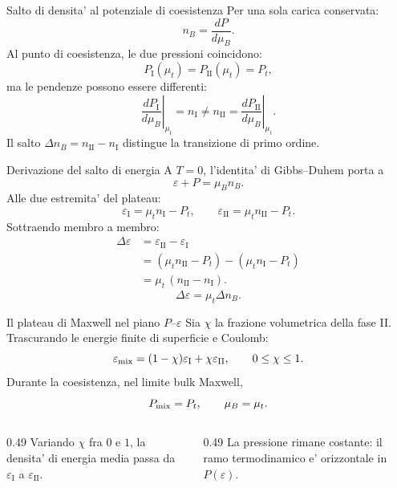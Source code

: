 \begin{frame}{Salto di densita' al potenziale di coesistenza}
\small
Per una sola carica conservata:
\[
n_B=\frac{dP}{d\mu_B}.
\]
Al punto di coesistenza, le due pressioni coincidono:
\[
P_{\mathrm I}(\mu_t)=P_{\mathrm{II}}(\mu_t)=P_t,
\]
ma le pendenze possono essere differenti:
\[
\left.\frac{dP_{\mathrm I}}{d\mu_B}\right|_{\mu_t}
=n_{\mathrm I}\ne n_{\mathrm{II}}
=\left.\frac{dP_{\mathrm{II}}}{d\mu_B}\right|_{\mu_t}.
\]
Il salto $\Delta n_B=n_{\mathrm{II}}-n_{\mathrm I}$ distingue
la transizione di primo ordine.
\end{frame}

\begin{frame}{Derivazione del salto di energia}
\small
A $T=0$, l'identita' di Gibbs--Duhem porta a
\[
\varepsilon+P=\mu_B n_B.
\]
Alle due estremita' del plateau:
\[
\varepsilon_{\mathrm I}=\mu_t n_{\mathrm I}-P_t,
\qquad
\varepsilon_{\mathrm{II}}=\mu_t n_{\mathrm{II}}-P_t.
\]
Sottraendo membro a membro:
\[
\begin{aligned}
\Delta\varepsilon
&=\varepsilon_{\mathrm{II}}-\varepsilon_{\mathrm I}\\
&=(\mu_t n_{\mathrm{II}}-P_t)
 -(\mu_t n_{\mathrm I}-P_t)\\
&=\mu_t\,(n_{\mathrm{II}}-n_{\mathrm I}).
\end{aligned}
\]
\[
\Delta\varepsilon=\mu_t\Delta n_B.
\]
\end{frame}

\begin{frame}{Il plateau di Maxwell nel piano $P$--$\varepsilon$}
\small
Sia $\chi$ la frazione volumetrica della fase II.
Trascurando le energie finite di superficie e Coulomb:
\[
\varepsilon_{\rm mix}=(1-\chi)\varepsilon_{\mathrm I}
+\chi\varepsilon_{\mathrm{II}},\qquad 0\le\chi\le1.
\]
Durante la coesistenza, nel limite bulk Maxwell,
\[
P_{\rm mix}=P_t,\qquad \mu_B=\mu_t.
\]
\begin{columns}[T,onlytextwidth]
\begin{column}{0.49\textwidth}
Variando $\chi$ fra $0$ e $1$, la densita' di energia media passa da $\varepsilon_{\mathrm I}$ a $\varepsilon_{\mathrm{II}}$.
\end{column}
\begin{column}{0.49\textwidth}
La pressione rimane costante: il ramo termodinamico e' orizzontale in $P(\varepsilon)$.
\end{column}
\end{columns}
\end{frame}

